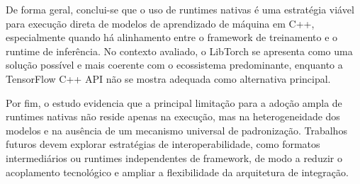 De forma geral, conclui-se que o uso de runtimes nativas é uma estratégia viável para
execução direta de modelos de aprendizado de máquina em C++, especialmente quando há
alinhamento entre o framework de treinamento e o runtime de inferência. No contexto
avaliado, o LibTorch se apresenta como uma solução possível e mais coerente com o
ecossistema predominante, enquanto a TensorFlow C++ API não se mostra adequada como
alternativa principal.

Por fim, o estudo evidencia que a principal limitação para a adoção ampla de runtimes
nativas não reside apenas na execução, mas na heterogeneidade dos modelos e na ausência
de um mecanismo universal de padronização. Trabalhos futuros devem explorar estratégias
de interoperabilidade, como formatos intermediários ou runtimes independentes de
framework, de modo a reduzir o acoplamento tecnológico e ampliar a flexibilidade da
arquitetura de integração.



%
